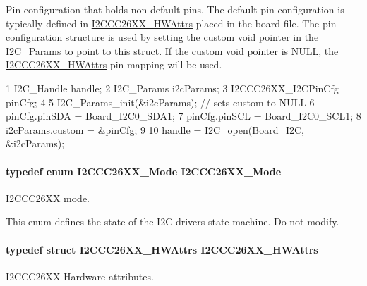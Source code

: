 Pin configuration that holds non-\/default pins. The default pin configuration is typically defined in \hyperlink{struct_i2_c_c_c26_x_x___h_w_attrs}{I2\+C\+C\+C26\+X\+X\+\_\+\+H\+W\+Attrs} placed in the board file. The pin configuration structure is used by setting the custom void pointer in the \hyperlink{struct_i2_c___params}{I2\+C\+\_\+\+Params} to point to this struct. If the custom void pointer is N\+U\+L\+L, the \hyperlink{struct_i2_c_c_c26_x_x___h_w_attrs}{I2\+C\+C\+C26\+X\+X\+\_\+\+H\+W\+Attrs} pin mapping will be used. 
\begin{DoxyCode}
1 I2C\_Handle handle;
2 I2C\_Params i2cParams;
3 I2CCC26XX\_I2CPinCfg pinCfg;
4 
5 I2C\_Params\_init(&i2cParams);     // sets custom to NULL
6 pinCfg.pinSDA = Board\_I2C0\_SDA1;
7 pinCfg.pinSCL = Board\_I2C0\_SCL1;
8 i2cParams.custom = &pinCfg;
9 
10 handle = I2C\_open(Board\_I2C, &i2cParams);
\end{DoxyCode}
\paragraph[{I2\+C\+C\+C26\+X\+X\+\_\+\+Mode}]{\setlength{\rightskip}{0pt plus 5cm}typedef enum {\bf I2\+C\+C\+C26\+X\+X\+\_\+\+Mode}  {\bf I2\+C\+C\+C26\+X\+X\+\_\+\+Mode}}\label{_i2_c_c_c26_x_x_8h_a8eaf242bab570cb7c90d5108c6dca937}


I2\+C\+C\+C26\+X\+X mode. 

This enum defines the state of the I2\+C driver\textquotesingle{}s state-\/machine. Do not modify. 
\paragraph[{I2\+C\+C\+C26\+X\+X\+\_\+\+H\+W\+Attrs}]{\setlength{\rightskip}{0pt plus 5cm}typedef struct {\bf I2\+C\+C\+C26\+X\+X\+\_\+\+H\+W\+Attrs}  {\bf I2\+C\+C\+C26\+X\+X\+\_\+\+H\+W\+Attrs}}\label{_i2_c_c_c26_x_x_8h_ab3c00c0267b7eb96f1459bfb823bdd79}


I2\+C\+C\+C26\+X\+X Hardware attributes. 

